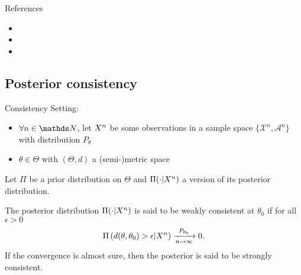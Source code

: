 \begin{frame}{References}
\begin{itemize}
	\item {}
	\item {}
	\item {}
\end{itemize}

\end{frame}



\subsection{Posterior consistency}

\begin{frame}{Consistency}
Setting:
\begin{itemize}
\item $\forall n \in \N$, let $X^n$ be some observations in a sample space $\{\mathcal{X}^n,\mathcal{A}^n\}$ with distribution $P_\theta$
\item $\theta \in \Theta$ with $(\Theta,d)$ a (semi-)metric space 
\end{itemize}
\pause
Let $\Pi$ be a prior distribution on $\Theta$ and $\Pi(\cdot|X^n)$ a version of its posterior distribution. 
\begin{definition}[Consistency]
The posterior distribution $\Pi(\cdot|X^n)$ is said to be \alert{weakly consistent} at $\theta_0$ if for all $\epsilon >0$ 
$$
\Pi\left(d(\theta,\theta_0) > \epsilon|X^n\right) \xrightarrow[n\to \infty]{P_{\theta_0}} 0. 
$$
If the convergence is \alert{almost sure}, then the posterior is said to be \alert{strongly consistent}.
\end{definition}
\end{frame}



